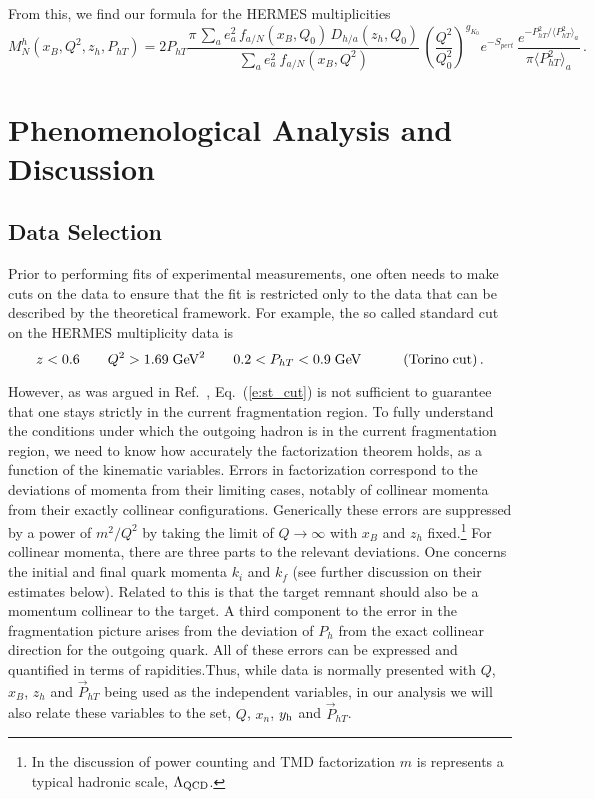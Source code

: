 \documentclass[final,3p,times,onecolumn,sort&compress,hidelinks]{elsarticle}
\newcommand{\xbj}{x_B}
\newcommand{\zh}{z_h}
\newcommand{\xn}{x_n}
\newcommand{\hady}{\ensuremath{y_{\rm h}}}
\begin{document}
From this, we find our formula for the HERMES multiplicities~\cite{Airapetian:2012ki} 
\begin{equation}
M_N^h(\xbj, Q^2,\zh, P_{hT}) =
2P_{hT}\frac{\pi\, \sum_{a} e_a^2 \,f_{a/N}(\xbj, Q_0)\,D_{h/a}(\zh, Q_0)}
{\sum_{a} e_a^2 \> f_{a/N} (\xbj,Q^2)} \,  \left( \frac{Q^2}{Q_0^2}\right)^{g_{K_0}}e^{-S_{pert}}\,
\frac{e^{-P_{hT}^2/\langle P_{hT}^2 \rangle_a}}{\pi\langle P_{hT}^2 \rangle_a}
\,. \label{e:mult_HERMES}
\end{equation}


\section{Phenomenological Analysis and Discussion}
\label{s:phenom}

\subsection{Data Selection}
\label{s:data}

Prior to performing  fits of  experimental measurements, one often needs to make cuts on the data to ensure that the fit is restricted only to the data that can be described by the theoretical  framework.  For example, the so called standard cut on the HERMES multiplicity data is~\cite{Anselmino:2013lza}
\begin{equation}
z < 0.6 \quad\quad Q^2 > 1.69 \; \textrm{GeV}^2  
\quad\quad 0.2 < P_{hT} < 0.9 \; \textrm{GeV} \quad\quad\quad{\rm (Torino\;cut)}\,.\label{e:st_cut}
\end{equation}

However, as was argued in Ref.~\cite{Boglione:2016bph}, Eq.~(\ref{e:st_cut}) is not sufficient to guarantee that one stays strictly in the current fragmentation region. To fully understand the conditions under which the outgoing hadron is in the current fragmentation region, we need to know how accurately the factorization theorem holds, as a function of the kinematic variables.
Errors in factorization correspond to the deviations of momenta
from their limiting cases, notably of collinear momenta from their
exactly collinear configurations.  Generically these errors are suppressed
by a power of $m^2/Q^2$ by taking the limit of $Q\rightarrow \infty$ with $\xbj$ and $\zh$ fixed.\footnote{In the discussion of power counting and TMD factorization $m$ is
  represents a typical hadronic scale, $\Lambda_{\rm QCD}$.}  For collinear momenta, there are
three parts to the relevant deviations.
One concerns the initial and final
quark momenta $k_i$ and $k_f$ (see further discussion on their estimates below).
 Related to this is that the target remnant should also be a momentum collinear to the target.   A third component to the error in the fragmentation picture arises from the deviation of $P_h$ from the exact collinear direction for the outgoing quark. All of these errors can be expressed and quantified  in terms of rapidities.Thus,  while data is normally presented with $Q$, $\xbj$, $\zh$ and $\vec{P}_{hT}$ being used as the independent variables, in our analysis we will also relate these variables to the set,
 $Q$, $\xn$, $\hady$ and $\vec{P}_{hT}$. 
 
\end{document}
